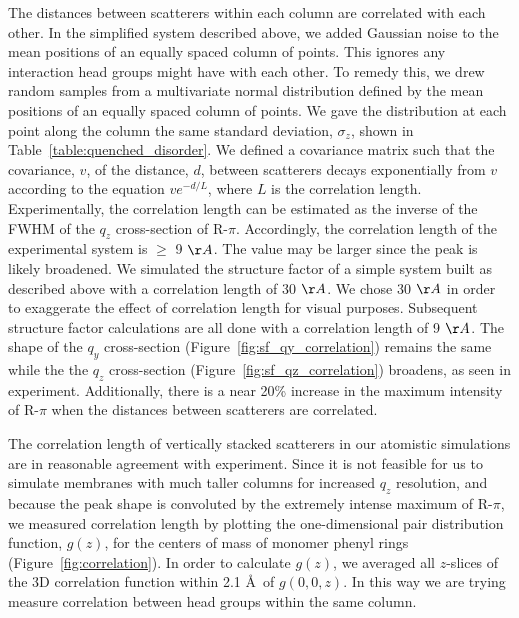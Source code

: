 \documentclass[journal=jpcbfk,manuscript=article]{achemso}
\begin{document}
  The distances between scatterers within each column are correlated with each
  other. In the simplified system described above, we added Gaussian noise to
  the mean positions of an equally spaced column of points. This ignores any
  interaction head groups might have with each other. To remedy this, we drew
  random samples from a multivariate normal distribution defined by the mean
  positions of an equally spaced column of points. We gave the distribution at
  each point along the column the same standard deviation, $\sigma_z$, shown in
  Table~\ref{table:quenched_disorder}. We defined a covariance matrix such
  that the covariance, $v$, of the distance, $d$, between scatterers decays
  exponentially from $v$ according to the equation $ve^{-d/L}$, where $L$ is the
  correlation length. Experimentally, the correlation length can be estimated as
  the inverse of the FWHM of the $q_z$ cross-section of R-$\pi$. Accordingly,
  the correlation length of the experimental system is $\geq$ 9 $\AA$. The value
  may be larger since the peak is likely broadened. We simulated the structure
  factor of a simple system built as described above with a correlation length of
  30 $\AA$. We chose 30 $\AA$ in order to exaggerate the effect of correlation
  length for visual purposes. Subsequent structure factor calculations are all
  done with a correlation length of 9 $\AA$. The shape of the $q_y$ cross-section
  (Figure~\ref{fig:sf_qy_correlation}) remains the same while the the $q_z$
  cross-section (Figure~\ref{fig:sf_qz_correlation}) broadens, as seen in
  experiment. Additionally, there is a near 20\% increase in the maximum
  intensity of R-$\pi$ when the distances between scatterers are correlated.


  The correlation length of vertically stacked scatterers in our atomistic simulations
  are in reasonable agreement with experiment. Since it is not feasible for us to
  simulate membranes with much taller columns for increased $q_z$ resolution, and
  because the peak shape is convoluted by the extremely intense maximum of
  R-$\pi$, we measured correlation length by plotting the one-dimensional pair
  distribution function, $g(z)$, for the centers of mass of monomer phenyl rings
  (Figure~\ref{fig:correlation}). In order to calculate $g(z)$, we averaged all
  $z$-slices of the 3D correlation function within 2.1 \AA~of $g(0, 0, z)$. In this
  way we are trying measure correlation between head groups within the same column.
  
\end{document}
